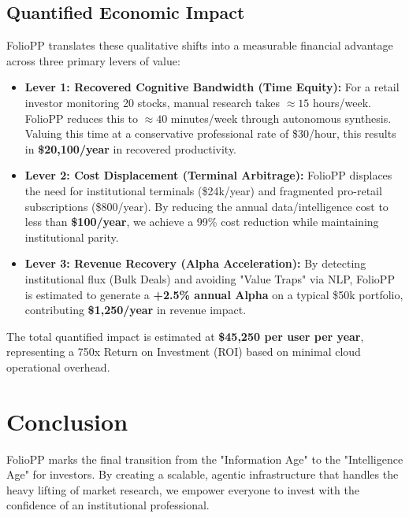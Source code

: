 \documentclass[13pt,a4paper]{article}
\begin{document}
\subsection{Quantified Economic Impact}
FolioPP translates these qualitative shifts into a measurable financial advantage across three primary levers of value:

\begin{itemize}
    \item \textbf{Lever 1: Recovered Cognitive Bandwidth (Time Equity):} For a retail investor monitoring 20 stocks, manual research takes $\approx 15$ hours/week. FolioPP reduces this to $\approx 40$ minutes/week through autonomous synthesis. Valuing this time at a conservative professional rate of \$30/hour, this results in \textbf{\$20,100/year} in recovered productivity.
    \item \textbf{Lever 2: Cost Displacement (Terminal Arbitrage):} FolioPP displaces the need for institutional terminals (\$24k/year) and fragmented pro-retail subscriptions (\$800/year). By reducing the annual data/intelligence cost to less than \textbf{\$100/year}, we achieve a 99\% cost reduction while maintaining institutional parity.
    \item \textbf{Lever 3: Revenue Recovery (Alpha Acceleration):} By detecting institutional flux (Bulk Deals) and avoiding "Value Traps" via NLP, FolioPP is estimated to generate a \textbf{+2.5\% annual Alpha} on a typical \$50k portfolio, contributing \textbf{\$1,250/year} in revenue impact.
\end{itemize}

The total quantified impact is estimated at \textbf{\$45,250 per user per year}, representing a 750x Return on Investment (ROI) based on minimal cloud operational overhead.

\section{Conclusion}
FolioPP marks the final transition from the "Information Age" to the "Intelligence Age" for investors. By creating a scalable, agentic infrastructure that handles the heavy lifting of market research, we empower everyone to invest with the confidence of an institutional professional.
\end{document}
